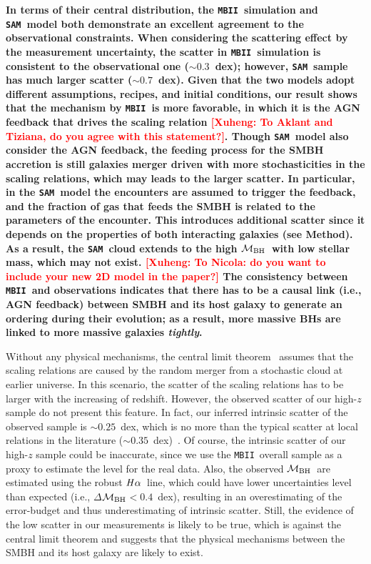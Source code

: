 \documentclass{natureprintstyle}
\newcommand{\mbh}{$\mathcal M_{\rm BH}$}
\newcommand{\halpha}{${\it H}\alpha$}
\newcommand{\sam}{\texttt{SAM}}
\newcommand{\mbii}{\texttt{MBII}}
\newcommand{\ding}[1]{\textcolor{red}{[{\bf Xuheng}: #1]}}
\begin{document}
{\bf In terms of their central distribution, the \mbii\ simulation and \sam\ model both demonstrate an excellent agreement to the observational constraints. When considering the scattering effect by the measurement uncertainty, the scatter in \mbii\ simulation is consistent to the observational one ($\sim0.3$~dex); however, \sam\ sample has much larger scatter ($\sim0.7$~dex). Given that the two models adopt different assumptions, recipes, and initial conditions, our result shows that the mechanism by \mbii\ is more favorable, in which it is the AGN feedback that drives the scaling relation \ding{To Aklant and Tiziana, do you agree with this statement?}. Though \sam\ model also consider the AGN feedback, the feeding process for the SMBH accretion is still galaxies merger driven with more stochasticities in the scaling relations, which may leads to the larger scatter. In particular, in the \sam\ model the encounters are assumed to trigger the feedback, and the fraction of gas that feeds the SMBH is related to the parameters of the 
encounter. This introduces additional scatter since it depends on the properties of both interacting galaxies (see Method). As a result, the \sam\ cloud extends to the high \mbh\ with low stellar mass, which may not exist. \ding{To Nicola: do you want to include your new 2D model in the paper?} The consistency between \mbii\ and observations indicates that there has to be a causal link (i.e., AGN feedback) between SMBH and its host galaxy to generate an ordering during their evolution; as a result, more massive BHs are linked to more massive galaxies {\it tightly}.
}

Without any physical mechanisms, the central limit theorem~\cite{Peng2007, Jahnke2011, Hirschmann2010} assumes that the scaling relations are caused by the random merger from a stochastic cloud at earlier universe. In this scenario, the scatter of the scaling relations has to be larger with the increasing of redshift. However, the observed scatter of our high-$z$ sample do not present this feature. In fact, our inferred intrinsic scatter of the observed sample is $\sim0.25$~dex, which is no more than the typical scatter at local relations in the literature ($\sim0.35$~dex)~\cite{Kormendy13, Gul++09}. Of course, the intrinsic scatter of our high-$z$ sample could be inaccurate, since we use the \mbii\ overall sample as a proxy to estimate the level for the real data.
Also, the observed \mbh\ are estimated using the robust \halpha\ line, which could have lower uncertainties level than expected (i.e., $\Delta$\mbh$<0.4$~dex), resulting in an overestimating of the error-budget and thus underestimating of intrinsic scatter. Still, the evidence of the low scatter in our measurements is likely to be true, which is against the central limit theorem and suggests that the physical mechanisms between the SMBH and its host galaxy are likely to exist. 
\end{document}

